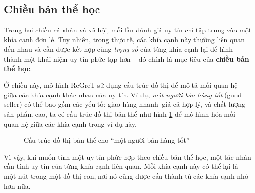 \subsection{Chiều bản thể học}

Trong hai chiều cá nhân và xã hội, mỗi lần đánh giá uy tín chỉ tập trung vào một khía cạnh đơn lẻ. Tuy nhiên, trong thực tế,
các khía cạnh này thường liên quan đến nhau và cần được kết hợp cùng \textit{trọng số} của từng khía cạnh lại để hình thành một khái niệm uy tín phức tạp hơn --
đó chính là mục tiêu của \textbf{chiều bản thể học}.

Ở chiều này, mô hình ReGreT sử dụng cấu trúc đồ thị để mô tả mối quan hệ giữa các khía cạnh khác nhau của uy tín.
Ví dụ, \textit{một người bán hàng tốt} (good seller) có thể bao gồm các yếu tố: giao hàng nhanh, giá cả hợp lý, và chất lượng sản phẩm cao,
ta có cấu trúc đồ thị bản thể như hình \ref{fig:good-seller-ontological-structure} để mô hình hóa mối quan hệ giữa các khía cạnh trong ví dụ này.

\begin{figure}[H]
  \centering
  \caption{Cấu trúc đồ thị bản thể cho ``một người bán hàng tốt''}
  \label{fig:good-seller-ontological-structure}
\end{figure}

Vì vậy, khi muốn tính một uy tín phức hợp theo chiều bản thể học, một tác nhân cần tính uy tín của từng khía cạnh liên quan.
Mỗi khía cạnh này có thể lại là một nút trong một đồ thị con, nơi nó cũng được cấu thành từ các khía cạnh nhỏ hơn nữa.

